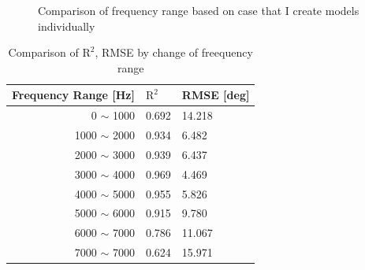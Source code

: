 \begin{figure}[p]
{     \label{fig:freq_range_4000}} 
              
     \caption{Comparison of frequency range based on case that I create models individually}
    \label{fig:result_freq_renge_2}
\end{figure}

\begin{table}[ht]
\caption{Comparison of $\mathrm{R}^2$, RMSE by change of freequency range}    
\vspace{1zh}
\centering
  \begin{tabular}{r||p{6em}|p{6em}} \hline
    Frequency Range [Hz] & $\mathrm{R}^2$ & RMSE [deg] \\ \hline\hline 
    0 $\sim$ 1000 & 0.692 &  14.218 \\ \hline 
    1000 $\sim$ 2000 & 0.934 &  6.482 \\ \hline
    2000 $\sim$ 3000 & 0.939 &  6.437 \\ \hline
    3000 $\sim$ 4000 & 0.969 &  4.469 \\ \hline
    4000 $\sim$ 5000 & 0.955 &  5.826 \\ \hline
    5000 $\sim$ 6000 & 0.915 &  9.780 \\ \hline
    6000 $\sim$ 7000 & 0.786 &  11.067 \\ \hline
    7000 $\sim$ 7000 & 0.624 &  15.971 \\ \hline
  \end{tabular}
  \label{tab:result_freq_range_r2_rmse}
\end{table}

